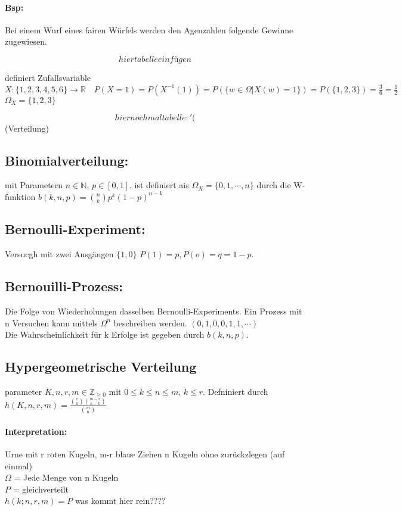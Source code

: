 \documentclass{article}
\begin{document}
\paragraph*{Bsp:} Bei einem Wurf eines fairen Würfels werden den Agenzahlen folgende Gewinne zugewiesen. 

\[hier tabelle einfügen\]

definiert Zufallsvariable \(X: \{1,2,3,4,5,6\} \to \mathbb{R} \quad P(X = 1) = P(X^{-1}(1)) = P(\{w \in \Omega \vert X(w) = 1\}) = P(\{1,2,3\}) = \frac{3}{6} = \frac{1}{2}\) \(\Omega_X = \{1,2,3\}\)

\[hier nochmal tabelle :'(\]
(Verteilung)

\subsection*{Binomialverteilung:} mit Parametern \(n \in \mathbb{N}\), \(p \in [0,1]\). ist definiert ais \(\Omega_X = \{0,1, \cdots, n\}\) durch die W-funktion \(b(k, n ,p) = \binom{n}{k} p^k (1-p)^{n-k}\)

\subsection*{Bernoulli-Experiment:} Versucgh mit zwei Ausgängen \(\{1, 0\}\) \(P(1) = p, P(o) = q = 1-p\).

\subsection*{Bernouilli-Prozess:} Die Folge von Wiederholungen dasselben Bernoulli-Experiments. Ein Prozess mit n Versuchen kann mittels \(\Omega^n\) beschreiben werden. \((0,1,0,0,1,1, \cdots)\) \\Die Wahrscheinlichkeit für k Erfolge ist gegeben durch \(b(k,n,p)\). 

\subsection*{Hypergeometrische Verteilung}
parameter \(K,n,r,m \in \mathbb{Z}_{\geq 0}\) mit \(0 \leq k \leq n \leq m\), \(k \leq r\). Defniniert durch \(h(K, n,r,m) = \frac{\binom{r}{k} \binom{m-r}{n-k}}{ \binom{m}{n}}\)

\paragraph*{Interpretation:} Urne mit r roten Kugeln, m-r blaue Ziehen n Kugeln ohne zurückzlegen (auf einmal) \\ \(\Omega\) = Jede Menge von n Kugeln \\ \(P\) = gleichverteilt \\ \(h(k; n,r,m) = P\) was kommt hier rein????
\end{document}
